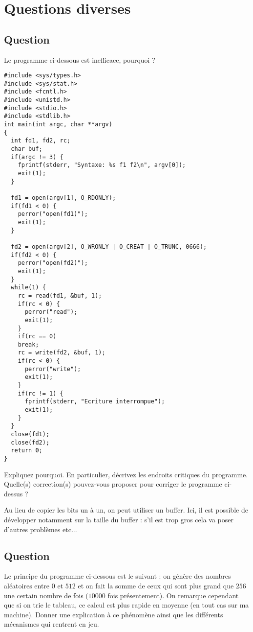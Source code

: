 \documentclass[11pt]{article}
\newcounter{questionc}
\newcommand{\question}{\stepcounter{questionc}\subsection{Question \thequestionc}}
\begin{document}
\section{Questions diverses}

\question

Le programme ci-dessous est inefficace, pourquoi ?
\begin{verbatim}
#include <sys/types.h>
#include <sys/stat.h>
#include <fcntl.h>
#include <unistd.h>
#include <stdio.h>
#include <stdlib.h>
int main(int argc, char **argv)
{
  int fd1, fd2, rc;
  char buf;
  if(argc != 3) {
    fprintf(stderr, "Syntaxe: %s f1 f2\n", argv[0]);
    exit(1);
  }

  fd1 = open(argv[1], O_RDONLY);
  if(fd1 < 0) {
    perror("open(fd1)");
    exit(1);
  }

  fd2 = open(argv[2], O_WRONLY | O_CREAT | O_TRUNC, 0666);
  if(fd2 < 0) {
    perror("open(fd2)");
    exit(1);
  }
  while(1) {
    rc = read(fd1, &buf, 1);
    if(rc < 0) {
      perror("read");
      exit(1);
    }
    if(rc == 0)
    break;
    rc = write(fd2, &buf, 1);
    if(rc < 0) {
      perror("write");
      exit(1);
    }
    if(rc != 1) {
      fprintf(stderr, "Ecriture interrompue");
      exit(1);
    }
  }
  close(fd1);
  close(fd2);
  return 0;
}
\end{verbatim}

Expliquez pourquoi. En particulier, décrivez les endroits critiques du programme. Quelle(s) correction(s) pouvez-vous proposer pour corriger le programme ci-dessus ?

\begin{solution}
  Au lieu de copier les bits un à un, on peut utiliser un buffer. Ici, il est possible de développer notamment sur la taille du buffer : s'il est trop gros cela va poser d'autres problèmes etc...
\end{solution}

\question

Le principe du programme ci-dessous est le suivant : on génère des nombres aléatoires entre \(0\) et \(512\) et on fait la somme de ceux qui sont plus grand que \(256\) une certain nombre de fois (\(10000\) fois présentement). On remarque cependant que si on trie le tableau, ce calcul est plus rapide en moyenne (en tout cas sur ma machine). Donner une explication à ce phénomène ainsi que les différents mécanismes qui rentrent en jeu.
\end{document}
